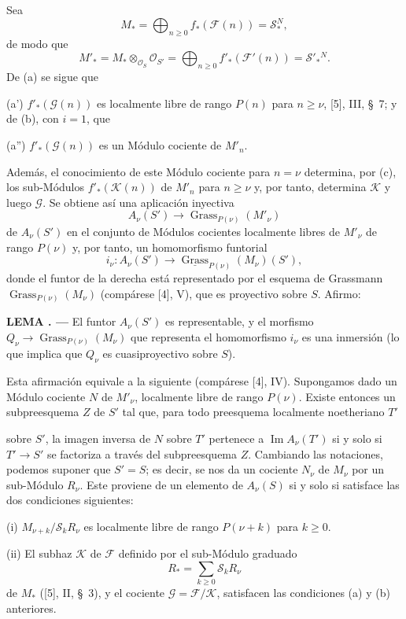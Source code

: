 \documentclass[11pt,twoside,openany]{book}
\numberwithin{equation}{section}
\newcommand{\src}[1]{%
  \phantomsection\hypertarget{src:#1}{}%
  \marginpar{\raggedleft\footnotesize\sffamily #1}%
}
\theoremstyle{plain}
\theoremstyle{definition}
\theoremstyle{remark}
\newcommand{\result}[2]{%
  \par\medskip\noindent\textbf{#1%
  \if\relax\detokenize{#2}\relax\else\space#2\fi. ---}\enspace
}
\newcommand{\FgaUnitKey}{frontmatter}
\renewcommand{\src}[1]{%
  \phantomsection\hypertarget{src:\FgaUnitKey:#1}{}%
  \marginpar{\raggedleft\footnotesize\sffamily #1}%
}
\theoremstyle{plain}
\theoremstyle{definition}
\theoremstyle{remark}
\begin{document}
Sea
\[
M_* =\bigoplus_{n\geq0}f_*(\mathcal F(n))=\mathcal S_*^{N},
\]
de modo que
\[
M'_* =M_*\otimes_{\mathcal O_S}\mathcal O_{S'}
=\bigoplus_{n\geq0}f'_*(\mathcal F'(n))=\mathcal S'_*{}^{N}.
\]
De (a) se sigue que

\noindent (a') $f'_*(\mathcal G(n))$ es localmente libre de rango $P(n)$ para
$n\geq\nu$, [5], III, \S~7; y de (b), con $i=1$, que

\noindent (a'') $f'_*(\mathcal G(n))$ es un Módulo cociente de $M'_n$.

Además, el conocimiento de este Módulo cociente para $n=\nu$ determina, por
(c), los sub-Módulos $f'_*(\mathcal K(n))$ de $M'_n$ para $n\geq\nu$ y, por
tanto, determina $\mathcal K$ y luego $\mathcal G$. Se obtiene así una
aplicación inyectiva
\[
A_\nu(S')\longrightarrow\operatorname{Grass}_{P(\nu)}(M'_\nu)
\]
de $A_\nu(S')$ en el conjunto de Módulos cocientes localmente libres de
$M'_\nu$ de rango $P(\nu)$ y, por tanto, un homomorfismo funtorial
\[
i_\nu:A_\nu(S')\longrightarrow
\underline{\operatorname{Grass}}_{P(\nu)}(M_\nu)(S'),
\]
donde el funtor de la derecha está representado por el esquema de Grassmann
$\operatorname{Grass}_{P(\nu)}(M_\nu)$ (compárese [4], V), que es proyectivo
sobre $S$. Afirmo:

\result{LEMA}{3.3} El funtor $A_\nu(S')$ es representable, y el morfismo
$Q_\nu\longrightarrow\operatorname{Grass}_{P(\nu)}(M_\nu)$ que representa el
homomorfismo $i_\nu$ es una inmersión (lo que implica que $Q_\nu$ es
cuasiproyectivo sobre $S$).

Esta afirmación equivale a la siguiente (compárese [4], IV). Supongamos dado
un Módulo cociente $N$ de $M'_\nu$, localmente libre de rango $P(\nu)$. Existe
entonces un subpreesquema $Z$ de $S'$ tal que, para todo preesquema localmente
noetheriano $T'$
\src{262}
sobre $S'$, la imagen inversa de $N$ sobre $T'$ pertenece a
$\operatorname{Im}A_\nu(T')$ si y solo si $T'\longrightarrow S'$ se factoriza
a través del subpreesquema $Z$. Cambiando las notaciones, podemos suponer que
$S'=S$; es decir, se nos da un cociente $N_\nu$ de $M_\nu$ por un sub-Módulo
$R_\nu$. Este proviene de un elemento de $A_\nu(S)$ si y solo si satisface las
dos condiciones siguientes:

\medskip
\noindent (i) $M_{\nu+k}/\mathcal S_kR_\nu$ es localmente libre de rango
$P(\nu+k)$ para $k\geq0$.

\smallskip
\noindent (ii) El subhaz $\mathcal K$ de $\mathcal F$ definido por el
sub-Módulo graduado
\[
R_* =\sum_{k\geq0}\mathcal S_kR_\nu
\]
de $M_*$ ([5], II, \S~3), y el cociente
$\mathcal G=\mathcal F/\mathcal K$, satisfacen las condiciones (a) y (b)
anteriores.
\end{document}
